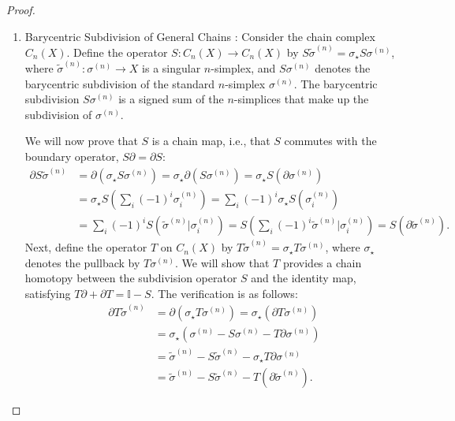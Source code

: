 \begin{proof}
\begin{enumerate}
	\item Barycentric Subdivision of General Chains \cite[\S 2.21 (3)]{hatcher2005algebraic}: Consider the chain complex \( C_n(X) \). Define the operator \( S: C_n(X) \to C_n(X) \) by \( S\tilde{\sigma}^{(n)} = \sigma_\star S\sigma^{(n)} \), where \( \tilde{\sigma}^{(n)}: \sigma^{(n)} \to X \) is a singular \( n \)-simplex, and \( S\sigma^{(n)} \) denotes the barycentric subdivision of the standard \( n \)-simplex \( \sigma^{(n)} \). The barycentric subdivision \( S\sigma^{(n)} \) is a signed sum of the \( n \)-simplices that make up the subdivision of \( \sigma^{(n)} \).
		
	We will now prove that \( S \) is a chain map, i.e., that \( S \) commutes with the boundary operator, \( S\partial = \partial S \):
	\begin{align}
		\partial S\tilde{\sigma}^{(n)} & = \partial (\sigma_\star S\sigma^{(n)}) = \sigma_\star \partial (S\sigma^{(n)}) = \sigma_\star S(\partial \sigma^{(n)})        \\
		                 & = \sigma_\star S\left(\sum_i (-1)^i \sigma^{(n)}_i\right)  = \sum_i (-1)^i \sigma_\star S(\sigma^{(n)}_i)                      \\ 
		                 & = \sum_i (-1)^i S(\tilde{\sigma}^{(n)} \vert \sigma^{(n)}_i) = S\left(\sum_i (-1)^i \tilde{\sigma}^{(n)} \vert \sigma^{(n)}_i\right) = S(\partial \tilde{\sigma}^{(n)}). 
	\end{align}
	Next, define the operator \( T \) on \( C_n(X) \) by \( T\tilde{\sigma}^{(n)} = \sigma_\star T\sigma^{(n)} \), where \( \sigma_\star \) denotes the pullback by \( T\sigma^{(n)} \). We will show that \( T \) provides a chain homotopy between the subdivision operator \( S \) and the identity map, satisfying \( T\partial + \partial T = \mathbb{I} - S \). The verification is as follows:
	\begin{align}
		\partial T\tilde{\sigma}^{(n)} & = \partial (\sigma_\star T\sigma^{(n)}) = \sigma_\star (\partial T\sigma^{(n)}) \\
		                 & = \sigma_\star (\sigma^{(n)} - S\sigma^{(n)} - T\partial \sigma^{(n)})          \\
		                 & = \tilde{\sigma}^{(n)} - S\tilde{\sigma}^{(n)} - \sigma_\star T\partial \sigma^{(n)}                        \\
		                 & = \tilde{\sigma}^{(n)} - S\tilde{\sigma}^{(n)} - T(\partial \tilde{\sigma}^{(n)}).                                        
	\end{align}
		

\end{enumerate}
\end{proof}
